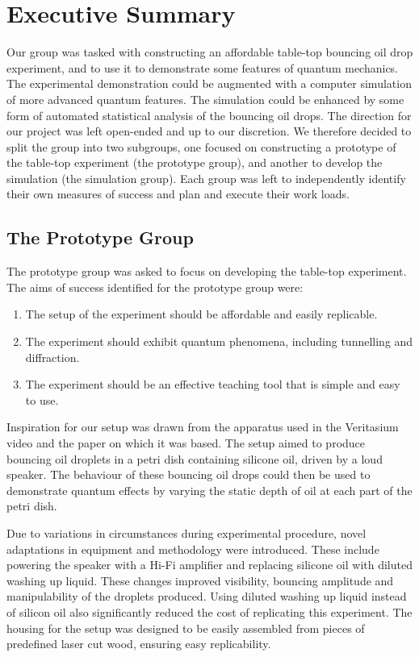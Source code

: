 \section*{Executive Summary}
Our group was tasked with constructing an affordable table-top bouncing oil drop experiment, and to use it to demonstrate some features of quantum mechanics. The experimental demonstration could be augmented with a computer simulation of more advanced quantum features. The simulation could be enhanced by some form of automated statistical analysis of the bouncing oil drops. The direction for our project was left open-ended and up to our discretion. We therefore decided to split the group into two subgroups, one focused on constructing a prototype of the table-top experiment (the prototype group), and another to develop the simulation (the simulation group). Each group was left to independently identify their own measures of success and plan and execute their work loads.

\subsection*{The Prototype Group}
The prototype group was asked to focus on developing the table-top experiment. The aims of success identified for the prototype group were:
\begin{enumerate}
    \item The setup of the experiment should be affordable and easily replicable.
\item The experiment should exhibit quantum phenomena, including tunnelling and diffraction.
\item The experiment should be an effective teaching tool that is simple and easy to use.
\end{enumerate}

Inspiration for our setup was drawn from the apparatus used in the Veritasium video \cite{Veritasium:2016} and the paper on which it was based. The setup aimed to produce bouncing oil droplets in a petri dish containing silicone oil, driven by a loud speaker. The behaviour of these bouncing oil drops could then be used to demonstrate quantum effects by varying the static depth of oil at each part of the petri dish.

Due to variations in circumstances during experimental procedure, novel adaptations in equipment and methodology were introduced. These include powering the speaker with a Hi-Fi amplifier and replacing silicone oil with diluted washing up liquid. These changes improved visibility, bouncing amplitude and manipulability of the droplets produced. Using diluted washing up liquid instead of silicon oil also significantly reduced the cost of replicating this experiment. The housing for the setup was designed to be easily assembled from pieces of predefined laser cut wood, ensuring easy replicability.  

